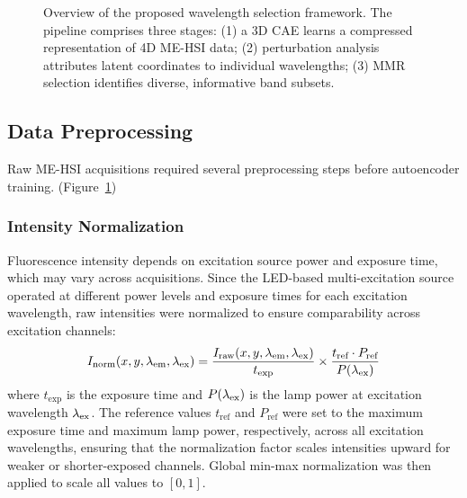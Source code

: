 \begin{figure}[!t]
\caption{Overview of the proposed wavelength selection framework. The pipeline comprises three stages: (1) a 3D CAE learns a compressed representation of 4D ME-HSI data; (2) perturbation analysis attributes latent coordinates to individual wavelengths; (3) MMR selection identifies diverse, informative band subsets.}
\label{fig:pipeline}
\end{figure}

\subsection{Data Preprocessing}
\label{sec:preprocessing}

Raw ME-HSI acquisitions required several preprocessing steps before autoencoder training. (Figure~\ref{fig:pipeline})

\subsubsection{Intensity Normalization}
Fluorescence intensity depends on excitation source power and exposure time, which may vary across acquisitions.
Since the LED-based multi-excitation source operated at different power levels and exposure times for each excitation wavelength, raw intensities were normalized to ensure comparability across excitation channels:
\begin{equation}
I_{\text{norm}}(x, y, \lambda_{\text{em}}, \lambda_{\text{ex}}) = \frac{I_{\text{raw}}(x, y, \lambda_{\text{em}}, \lambda_{\text{ex}})}{t_{\text{exp}}} \times \frac{t_{\text{ref}} \cdot P_{\text{ref}}}{P(\lambda_{\text{ex}})}
\label{eq:normalization}
\end{equation}
where $t_{\text{exp}}$ is the exposure time and $P(\lambda_{\text{ex}})$ is the lamp power at excitation wavelength $\lambda_{\text{ex}}$.
The reference values $t_{\text{ref}}$ and $P_{\text{ref}}$ were set to the maximum exposure time and maximum lamp power, respectively, across all excitation wavelengths, ensuring that the normalization factor scales intensities upward for weaker or shorter-exposed channels.
Global min-max normalization was then applied to scale all values to $[0, 1]$.

